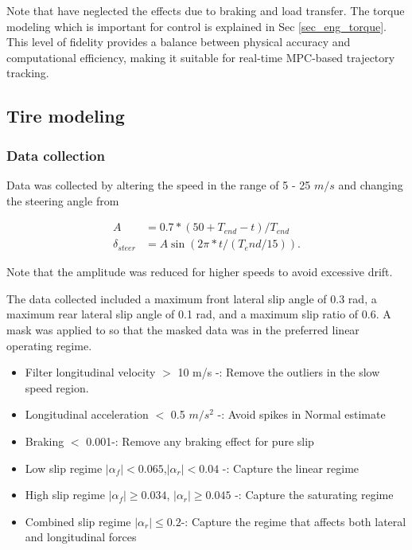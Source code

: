 \documentclass{article}
\begin{document}
Note that have neglected the effects due to braking and load transfer. The torque modeling which is important for control is explained in Sec \ref{sec_eng_torque}. This level of fidelity provides a balance between physical accuracy and computational efficiency, making it suitable for real-time MPC-based trajectory tracking.

\subsection{Tire modeling}

\subsubsection{Data collection}

Data was collected by altering the speed in the range of 5 - 25 $m/s$ and changing the steering angle from 

\begin{align*}
    A &= 0.7*(50 + T_{end} - t)/T_{end} \\
    \delta_{steer} &= A \sin(2\pi*t/(T_end/15)).
\end{align*}

Note that the amplitude was reduced for higher speeds to avoid excessive drift.

The data collected included a maximum front lateral slip angle of 0.3 rad, a maximum rear lateral slip angle of 0.1 rad, and a maximum slip ratio of 0.6. A mask was applied to so that the masked data was in the preferred linear operating regime.

\begin{itemize}
    \item Filter longitudinal velocity $>$ 10 m/s -: Remove the outliers in the slow speed region.
    \item Longitudinal acceleration $<$ 0.5 $m/s^2$ -: Avoid spikes in Normal estimate 
    \item Braking $<$ 0.001-: Remove any braking effect for pure slip
	\item Low slip regime $|\alpha_f |<0.065$,$|\alpha_r |<0.04$ -: Capture the linear regime
	\item High slip regime $|\alpha_f |\geq0.034$, $|\alpha_r |\geq0.045$ -: Capture the saturating regime
	\item Combined slip regime $|\alpha_r |\leq 0.2 $-: Capture the regime that affects both lateral and longitudinal forces
\end{itemize}
\end{document}
